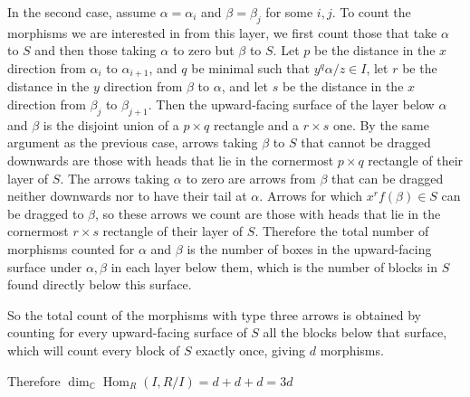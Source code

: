 \documentclass[a4paper,12pt,titlepage]{article}
\newcommand{\C}{\mathbb{C}}
\DeclareMathOperator{\Hom}{Hom}
\begin{document}
In the second case, assume $\alpha = \alpha_i$ and $\beta=\beta_j$ for some $i,j$. To count the morphisms we are interested in from this layer,
we first count those that take $\alpha$ to $S$ and then those taking $\alpha$ to zero but $\beta$ to $S$.
Let $p$ be the distance in the $x$ direction from $\alpha_i$ to $\alpha_{i+1}$, and $q$ be minimal such that  $y^{q}\alpha/z \in I$,
let $r$ be the distance in the $y$ direction from $\beta$ to $\alpha$, and let $s$ be the distance in the $x$ direction from $\beta_j$ to $\beta_{j+1}$.
Then the upward-facing surface of the layer below $\alpha$ and $\beta$ is the disjoint union of a $p \times q$ rectangle and a $r \times s$ one.
By the same argument as the previous case, arrows taking $\beta$ to $S$ that cannot be dragged downwards are those with heads that lie in the
cornermost $p \times q$ rectangle of their layer of $S$.
The arrows taking $\alpha$ to zero are arrows from $\beta$ that can be dragged neither downwards nor to have their tail at $\alpha$.
Arrows for which $x^rf(\beta) \in S$ can be dragged to $\beta$, so these arrows we count are those with heads that lie in
the cornermost $r \times s$ rectangle of their layer of $S$. Therefore the total number of morphisms counted for $\alpha$ and $\beta$ is
the number of boxes in the upward-facing surface under $\alpha,\beta$ in each layer below them, which is the number of blocks in $S$ found directly below this surface.

So the total count of the morphisms with type three arrows is obtained by counting for every upward-facing surface of $S$ all the blocks below that surface,
which will count every block of $S$ exactly once, giving $d$ morphisms.

Therefore $\dim_\C \Hom_R(I,R/I)=d+d+d=3d$
\end{document}
